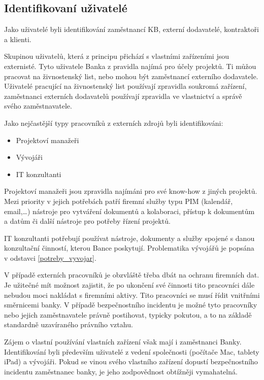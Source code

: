 \subsection{Identifikovaní uživatelé}
Jako uživatelé byli identifikování zaměstnancí KB, externí dodavatelé, kontraktoři a klienti.

Skupinou uživatelů, která z principu přichází s vlastními zařízeními jsou externisté. Tyto uživatele Banka z pravidla najímá pro účely projektů. Ti můžou pracovat na živnostenský list, nebo mohou být zaměstnancí externího dodavatele. Uživatelé pracující na živnostenský list používají zpravidla soukromá zařízení, zaměstnanci externích dodavatelů používají zpravidla ve vlastnictví a správě svého zaměstnavatele.

Jako nejčastější typy pracovníků z externích zdrojů byli identifikováni:
\begin{itemize}
    \item Projektoví manažeři
    \item Vývojáři
    \item IT konzultanti
\end{itemize}

Projektoví manažeři jsou zpravidla najímáni pro své know-how z jiných projektů. Mezi priority v jejich potřebách patří firemní služby typu PIM (kalendář, email,\ldots) nástroje pro vytváření dokumentů a kolaboraci, přístup k dokumentům a datům či další nástroje pro potřeby řízení projektů. 

IT konzultanti potřebují používat nástroje, dokumenty a služby spojené s danou konzultační činností, kterou Bance poskytují. Problematika vývojářů je popsána v odstavci \ref{potreby_vyvojar}.

V případě externích pracovníků je obzvláště třeba dbát na ochranu firemních dat. Je užitečné mít možnost zajistit, že po ukončení své činnosti tito pracovníci dále nebudou moci nakládat s firemními aktivy. Tito pracovníci se musí řídit vnitřními směrnicemi banky. V případě bezpečnostního incidentu je možné tyto pracovníky nebo jejich zaměstnavatele právně postihovat, typicky pokutou, a to na základě standardně uzavíraného právního vztahu.

Zájem o vlastní používání vlastních zařízení však mají i zaměstnanci Banky. Identifikování byli především uživatelé z vedení společnosti (počítače Mac, tablety iPad) a vývojáři. Pokud se vinou svého vlastního zařízení dopustí bezpečnostního incidentu zaměstnanec banky, je jeho zodpovědnost obtížněji vymahatelná.

